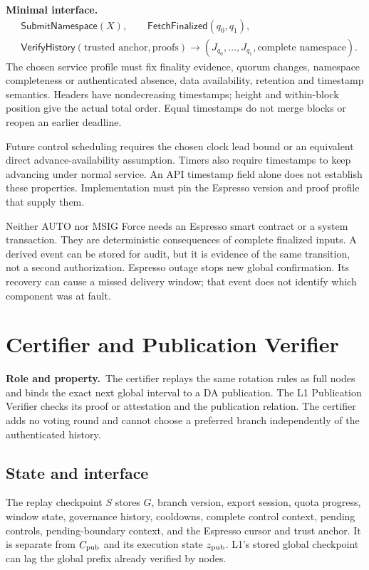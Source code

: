 \documentclass[11pt,a4paper]{article}
\newcommand{\api}[1]{\ensuremath{\mathsf{#1}}}
\newcommand{\role}{\textbf{Role and property.}\ }
\newcommand{\iface}{\textbf{Minimal interface.}\ }
\begin{document}
\iface
\[
\begin{aligned}
 &\api{SubmitNamespace}(X),\qquad
   \api{FetchFinalized}(q_0,q_1),\\
 &\api{VerifyHistory}(\text{trusted anchor},\text{proofs})
   \to (J_{q_0},\ldots,J_{q_1},\text{complete namespace}).
\end{aligned}
\]
The chosen service profile must fix finality evidence, quorum changes,
namespace completeness or authenticated absence, data availability,
retention and timestamp semantics. Headers have nondecreasing timestamps;
height and within-block position give the actual total order. Equal
timestamps do not merge blocks or reopen an earlier deadline.

Future control scheduling requires the chosen clock lead bound or an
equivalent direct advance-availability assumption. Timers also require
timestamps to keep advancing under normal service. An API timestamp
field alone does not establish these properties. Implementation must
pin the Espresso version and proof profile that supply them.

Neither AUTO nor MSIG Force needs an Espresso smart contract or a system
transaction. They are deterministic consequences of complete finalized
inputs. A derived event can be stored for audit, but it is evidence of
the same transition, not a second authorization. Espresso outage stops
new global confirmation. Its recovery can cause a missed delivery
window; that event does not identify which component was at fault.

\section{Certifier and Publication Verifier}\label{sec:publication}
\role The certifier replays the same rotation rules as full nodes and
binds the exact next global interval to a DA publication. The L1
Publication Verifier checks its proof or attestation and the publication
relation. The certifier adds no voting round and cannot choose a
preferred branch independently of the authenticated history.

\subsection{State and interface}
The replay checkpoint $S$ stores $G$, branch version, export session,
quota progress, window state, governance history, cooldowns, complete
control context, pending controls, pending-boundary context, and the
Espresso cursor and trust anchor. It is separate from $C_{\rm pub}$ and its execution state
$z_{\rm pub}$. L1's stored global checkpoint can lag the global prefix
already verified by nodes.
\end{document}
